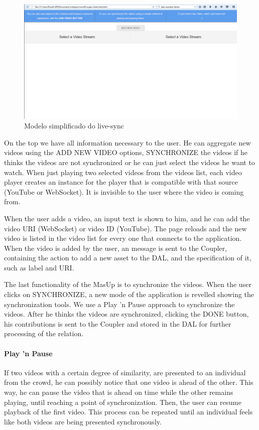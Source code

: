 \documentclass{sig-alternate-05-2015}
\begin{document}
\begin{figure}[h]
	\centerline{\includegraphics[scale=0.2] {figure/screen}}
	\caption{Modelo simplificado do live-sync}
	\label{screen1}
\end{figure}

On the top we have all information necessary to the user. He can aggregate new videos using the ADD NEW VIDEO options, SYNCHRONIZE the videos if he thinks the videos are not synchronized or he can just select the videos he want to watch. When just playing two selected videos from the videos list, each video player creates an instance for the player that is compatible with that source (YouTube or WebSocket). It is invisible to the user where the video is coming from.

When the user adds a video, an input text is shown to him, and he can add the video URI (WebSocket) or video ID (YouTube). The page reloads and the new video is listed in the video list for every one that connects to the application. When the video is added by the user, an message is sent to the Coupler, containing the action to add a new asset to the DAL, and the specification of it, such as label and URI.

The last functionality of the MasUp is to synchronize the videos. When the user clicks on SYNCHRONIZE, a new mode of the application is revelled showing the synchronization tools. We use a Play 'n Pause approach to synchronize the videos. After he thinks the videos are synchronized, clicking the DONE button, his contributions is sent to the Coupler and stored in the DAL for further processing of the relation.

\paragraph{Play 'n Pause}
If two videos with a certain degree of similarity, are presented to an individual from the crowd, he can possibly notice that one video is ahead of the other. This way, he can pause the video that is ahead on time while the other remains playing, until reaching a point of synchronization. Then, the user can resume playback of the first video. This process can be repeated until an individual feels like both videos are being presented synchronously.
\end{document}
